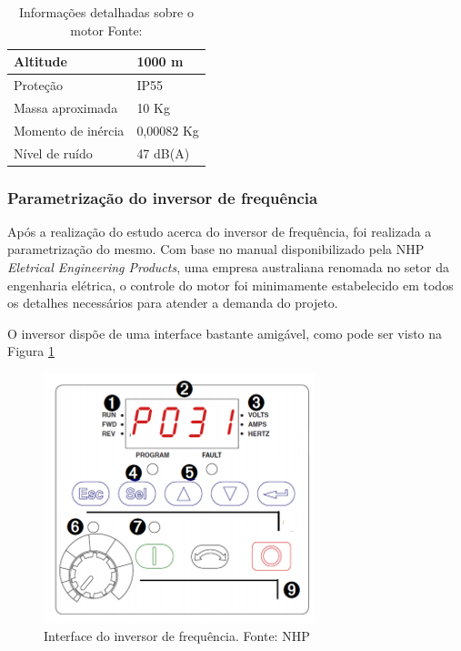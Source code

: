\begin{table}[h]
\begin{center}
\begin{tabular}{|p{5cm}|p{5cm}|}
                Altitude & 1000 m
                \\ \hline
                Proteção & IP55
                \\ \hline
                Massa aproximada & 10 Kg
                \\ \hline
                Momento de inércia & 0,00082 Kg
                \\ \hline
                Nível de ruído & 47 dB(A)
                \\ \hline
              \end{tabular}
              \caption[Informações detalhadas sobre o motor]{Informações detalhadas sobre o motor
              \protect Fonte: \cite{WEG_catalogo}}
            \label{tabela_info_motor}
        \end{center}
    \end{table}


\subsubsection*{Parametrização do inversor de frequência}

Após a realização do estudo acerca do inversor de frequência, foi realizada a parametrização do mesmo. Com base no manual disponibilizado pela NHP \textit{Eletrical Engineering Products}, uma empresa australiana renomada no setor da engenharia elétrica, o controle do motor foi minimamente estabelecido em todos os detalhes necessários para atender a demanda do projeto.

O inversor dispõe de uma interface bastante amigável, como pode ser visto na Figura \ref{Interface do inversor}

\begin{figure}[h!]
	\centering
		\includegraphics[keepaspectratio=true,scale=0.6]{figuras/interface_inversor.png}
	\caption{Interface do inversor de frequência. Fonte: NHP}
    \label{Interface do inversor}
\end{figure}

